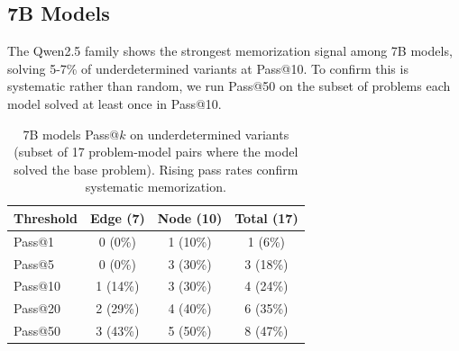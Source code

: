 \documentclass{article} %
\begin{document}
\subsection{7B Models}
\label{sec:7b_results}

\begin{table}[h]
\centering
{}
\caption{7B models on AIME (Pass@10).}
\label{tab:7b_aime}
\end{table}

The Qwen2.5 family shows the strongest memorization signal among 7B models, solving 5-7\% of underdetermined variants at Pass@10. To confirm this is systematic rather than random, we run Pass@50 on the subset of problems each model solved at least once in Pass@10.

\begin{table}[h]
\centering
\begin{tabular}{lccc}
\toprule
Threshold & Edge (7) & Node (10) & Total (17) \\
\midrule
Pass@1 & 0 (0\%) & 1 (10\%) & 1 (6\%) \\
Pass@5 & 0 (0\%) & 3 (30\%) & 3 (18\%) \\
Pass@10 & 1 (14\%) & 3 (30\%) & 4 (24\%) \\
Pass@20 & 2 (29\%) & 4 (40\%) & 6 (35\%) \\
Pass@50 & 3 (43\%) & 5 (50\%) & 8 (47\%) \\
\bottomrule
\end{tabular}
\caption{7B models Pass@$k$ on underdetermined variants (subset of 17 problem-model pairs where the model solved the base problem). Rising pass rates confirm systematic memorization.}
\label{tab:pass50}
\end{table}
\end{document}

